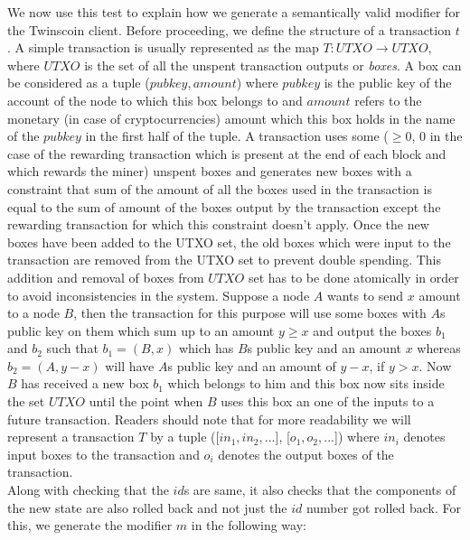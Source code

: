 \begin{enumerate}[\IEEEsetlabelwidth{Z}]
\begin{itemize}[]
We now use this test to explain how we generate a semantically valid modifier for the Twinscoin client. Before proceeding, we define the structure of a transaction $t$. A simple transaction is usually represented as the map $T : UTXO \to UTXO$, where $UTXO$ is the set of all the unspent transaction outputs or \textit{boxes}. A box can be considered as a tuple ($pubkey, amount$) where $pubkey$ is the public key of the account of the node to which this box belongs to and $amount$ refers to the monetary (in case of cryptocurrencies) amount which this box holds in the name of the $pubkey$ in the first half of the tuple. A transaction uses some ($\geq 0$, 0 in the case of the rewarding transaction which is present at the end of each block and which rewards the miner) unspent boxes and generates new boxes with a constraint that sum of the amount of all the boxes used in the transaction is equal to the sum of amount of the boxes output by the transaction except the rewarding transaction for which this constraint doesn't apply. Once the new boxes have been added to the UTXO set, the old boxes which were input to the transaction are removed from the UTXO set to prevent double spending. This addition and removal of boxes from $UTXO$ set has to be done atomically in order to avoid inconsistencies in the system. Suppose a node $A$ wants to send $x$ amount to a node $B$, then the transaction for this purpose will use some boxes with $A$s public key on them which sum up to an amount $y \geq x$ and output the boxes $b_1$ and $b_2$ such that $b_1 = (B, x)$ which has $B$s public key and an amount $x$ whereas $b_2 = (A, y-x)$ will have $A$s public key and an amount of $y-x$, if $y>x$. Now $B$ has received a new box $b_1$ which belongs to him and this box now sits inside the set $UTXO$ until the point when $B$ uses this box an one of the inputs to a future transaction. Readers should note that for more readability we will represent a transaction $T$ by a tuple ([$in_1, in_2, ...$], [$o_1, o_2, ...$]) where $in_i$ denotes input boxes to the transaction and $o_i$ denotes the output boxes of the transaction.\\
Along with checking that the $id$s are same, it also checks that the components of the new state are also rolled back and not just the $id$ number got rolled back. For this, we generate the modifier $m$ in the following way:
\begin{itemize}

\end{itemize}
\end{itemize}
\end{enumerate}
